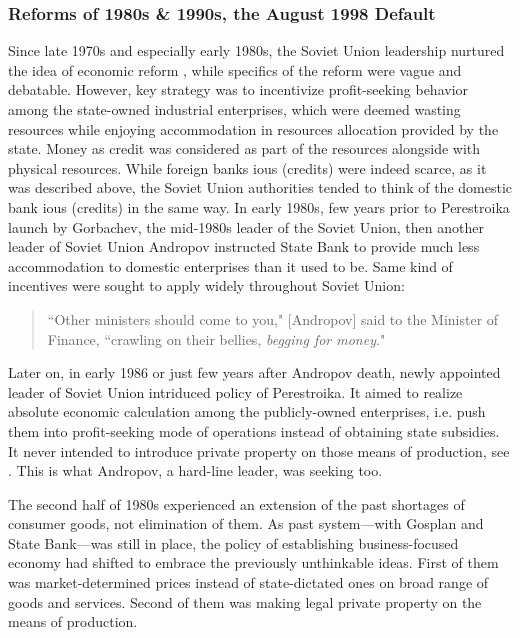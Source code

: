 \subsubsection{Reforms of 1980s \& 1990s, the August 1998 Default}

Since late 1970s and especially early 1980s, the Soviet Union leadership
nurtured the idea of economic reform \citep{zubok2021}, while specifics of
the reform were vague and debatable. However, key strategy was to
incentivize profit-seeking behavior among the state-owned industrial
enterprises, which were deemed wasting resources while enjoying
accommodation in resources allocation provided by the state. Money as
credit was considered as part of the resources alongside with physical
resources. While foreign banks \acp{iou} (credits) were indeed scarce, as it
was described above, the Soviet Union authorities tended to think of the
domestic bank \acp{iou} (credits) in the same way. In early 1980s, few years
prior to Perestroika launch by Gorbachev, the mid-1980s leader of the
Soviet Union, then another leader of Soviet Union Andropov instructed
State Bank to provide much less accommodation to domestic enterprises
than it used to be. Same kind of incentives were
sought to apply widely throughout Soviet Union:

\begin{quote}
 ``Other ministers should come to you," [Andropov] said to the Minister
 of Finance, ``crawling on their bellies, \textit{begging for money}."~\citep[p.~18, emphasis added]{zubok2021}
\end{quote}

Later on, in early 1986 or just few years after Andropov death, newly
appointed leader of Soviet Union intriduced policy of Perestroika. It
aimed to realize absolute economic calculation among the publicly-owned
enterprises, i.e. push them into profit-seeking mode of operations
instead of obtaining state subsidies. It never intended to introduce
private property on those means of production, see \citep{gorb}. This is what
Andropov, a hard-line leader, was seeking too.

The second half of 1980s experienced an extension of the past shortages
of consumer goods, not elimination of them. As past system---with
Gosplan and State Bank---was still in place, the policy of establishing
business-focused economy had shifted to embrace the previously
unthinkable ideas. First of them was market-determined prices instead of
state-dictated ones on broad range of goods and services. Second of them
was making legal private property on the means of production.

